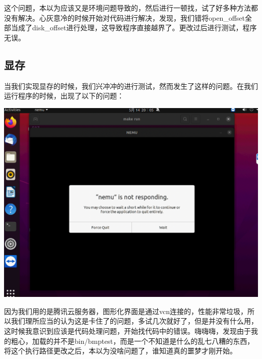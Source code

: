 \documentclass[UTF8,a4paper,10pt]{ctexart}
\begin{document}
这个问题，本以为应该又是环境问题导致的，然后进行一顿找，试了好多种方法都没有解决。心灰意冷的时候开始对代码进行解决，发现，我们错将open\_offset全部当成了disk\_offset进行处理，这导致程序直接越界了。更改过后进行测试，程序无误。

\subsection{显存}
当我们实现显存的时候，我们兴冲冲的进行测试，然而发生了这样的问题。在我们运行程序的时候，出现了以下的问题：
\begin{center}
  \includegraphics*[scale = 0.25]{pic/baocuo}
\end{center}
因为我们用的是腾讯云服务器，图形化界面是通过vcn连接的，性能非常垃圾，所以我们理所应当的认为这是卡住了的问题，多试几次就好了，但是并没有什么用，这时候我意识到应该是代码处理问题，开始找代码中的错误。嗨嗨嗨，发现由于我的粗心，加载的并不是bin/bmptest，而是一个不知道是什么的乱七八糟的东西，将这个执行路径更改之后，本以为没啥问题了，谁知道真的噩梦才刚开始。
\end{document}
